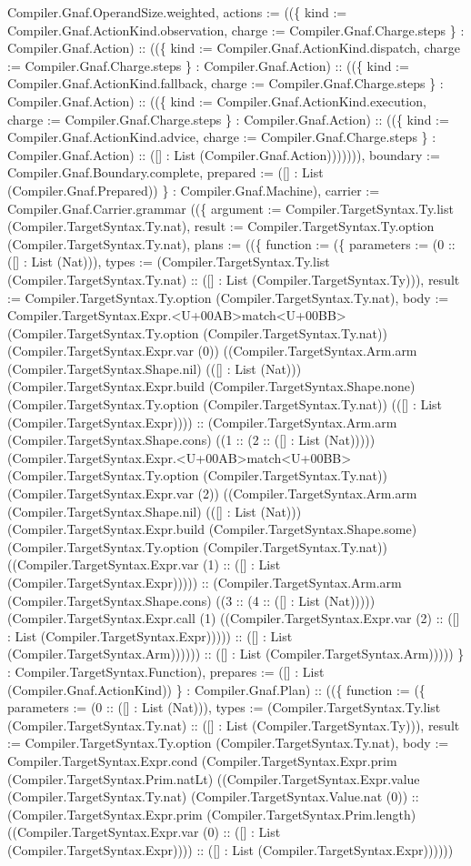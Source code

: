 \documentclass[11pt]{article}
\begin{document}
Compiler.Gnaf.OperandSize.weighted, actions := ((\{ kind := Compiler.Gnaf.ActionKind.observation, charge := Compiler.Gnaf.Charge.steps \} : Compiler.Gnaf.Action) :: ((\{ kind := Compiler.Gnaf.ActionKind.dispatch, charge := Compiler.Gnaf.Charge.steps \} : Compiler.Gnaf.Action) :: ((\{ kind := Compiler.Gnaf.ActionKind.fallback, charge := Compiler.Gnaf.Charge.steps \} : Compiler.Gnaf.Action) :: ((\{ kind := Compiler.Gnaf.ActionKind.execution, charge := Compiler.Gnaf.Charge.steps \} : Compiler.Gnaf.Action) :: ((\{ kind := Compiler.Gnaf.ActionKind.advice, charge := Compiler.Gnaf.Charge.steps \} : Compiler.Gnaf.Action) :: ([] : List (Compiler.Gnaf.Action))))))), boundary := Compiler.Gnaf.Boundary.complete, prepared := ([] : List (Compiler.Gnaf.Prepared)) \} : Compiler.Gnaf.Machine), carrier := Compiler.Gnaf.Carrier.grammar ((\{ argument := Compiler.TargetSyntax.Ty.list (Compiler.TargetSyntax.Ty.nat), result := Compiler.TargetSyntax.Ty.option (Compiler.TargetSyntax.Ty.nat), plans := ((\{ function := (\{ parameters := (0 :: ([] : List (Nat))), types := (Compiler.TargetSyntax.Ty.list (Compiler.TargetSyntax.Ty.nat) :: ([] : List (Compiler.TargetSyntax.Ty))), result := Compiler.TargetSyntax.Ty.option (Compiler.TargetSyntax.Ty.nat), body := Compiler.TargetSyntax.Expr.<U+00AB>match<U+00BB> (Compiler.TargetSyntax.Ty.option (Compiler.TargetSyntax.Ty.nat)) (Compiler.TargetSyntax.Expr.var (0)) ((Compiler.TargetSyntax.Arm.arm (Compiler.TargetSyntax.Shape.nil) (([] : List (Nat))) (Compiler.TargetSyntax.Expr.build (Compiler.TargetSyntax.Shape.none) (Compiler.TargetSyntax.Ty.option (Compiler.TargetSyntax.Ty.nat)) (([] : List (Compiler.TargetSyntax.Expr)))) :: (Compiler.TargetSyntax.Arm.arm (Compiler.TargetSyntax.Shape.cons) ((1 :: (2 :: ([] : List (Nat))))) (Compiler.TargetSyntax.Expr.<U+00AB>match<U+00BB> (Compiler.TargetSyntax.Ty.option (Compiler.TargetSyntax.Ty.nat)) (Compiler.TargetSyntax.Expr.var (2)) ((Compiler.TargetSyntax.Arm.arm (Compiler.TargetSyntax.Shape.nil) (([] : List (Nat))) (Compiler.TargetSyntax.Expr.build (Compiler.TargetSyntax.Shape.some) (Compiler.TargetSyntax.Ty.option (Compiler.TargetSyntax.Ty.nat)) ((Compiler.TargetSyntax.Expr.var (1) :: ([] : List (Compiler.TargetSyntax.Expr))))) :: (Compiler.TargetSyntax.Arm.arm (Compiler.TargetSyntax.Shape.cons) ((3 :: (4 :: ([] : List (Nat))))) (Compiler.TargetSyntax.Expr.call (1) ((Compiler.TargetSyntax.Expr.var (2) :: ([] : List (Compiler.TargetSyntax.Expr))))) :: ([] : List (Compiler.TargetSyntax.Arm)))))) :: ([] : List (Compiler.TargetSyntax.Arm))))) \} : Compiler.TargetSyntax.Function), prepares := ([] : List (Compiler.Gnaf.ActionKind)) \} : Compiler.Gnaf.Plan) :: ((\{ function := (\{ parameters := (0 :: ([] : List (Nat))), types := (Compiler.TargetSyntax.Ty.list (Compiler.TargetSyntax.Ty.nat) :: ([] : List (Compiler.TargetSyntax.Ty))), result := Compiler.TargetSyntax.Ty.option (Compiler.TargetSyntax.Ty.nat), body := Compiler.TargetSyntax.Expr.cond (Compiler.TargetSyntax.Expr.prim (Compiler.TargetSyntax.Prim.natLt) ((Compiler.TargetSyntax.Expr.value (Compiler.TargetSyntax.Ty.nat) (Compiler.TargetSyntax.Value.nat (0)) :: (Compiler.TargetSyntax.Expr.prim (Compiler.TargetSyntax.Prim.length) ((Compiler.TargetSyntax.Expr.var (0) :: ([] : List (Compiler.TargetSyntax.Expr)))) :: ([] : List (Compiler.TargetSyntax.Expr)))))) 
\end{document}
